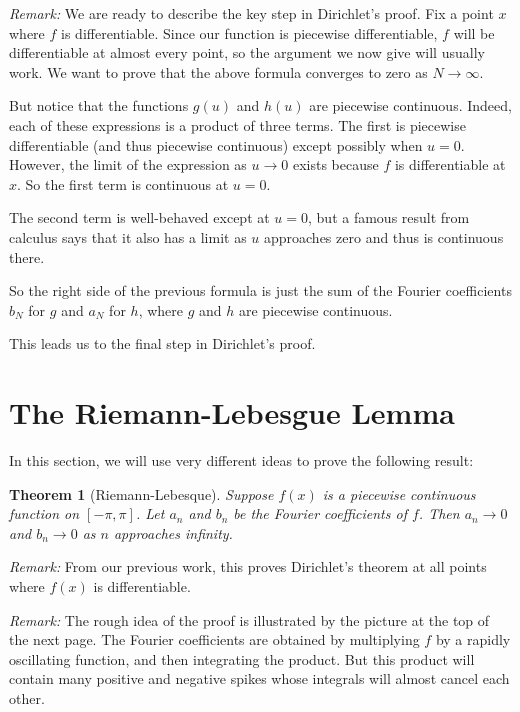 \documentclass[11pt, oneside]{amsart}
\newtheorem{theorem}{Theorem}
\begin{document}
{\em Remark:} We are ready to describe the key step in Dirichlet's proof. Fix a point $x$ where $f$ is differentiable. Since our function is piecewise differentiable, $f$ will be differentiable at almost every point, so the argument we now give will usually work. We want to prove that the above formula converges to zero as $N \rightarrow \infty$. 

But notice that the functions $g(u)$ and $h(u)$ are piecewise continuous. Indeed, each of these expressions is a product of three terms. The first is piecewise differentiable (and thus piecewise continuous) except possibly when $u = 0$. However, the limit of the expression as $u \rightarrow 0$ exists because $f$ is differentiable at $x$. So the first term is continuous at $u = 0$.

The second term is well-behaved except at $u = 0$, but a famous result from calculus says that it also has a limit as $u$ approaches zero and thus is continuous there. 

So the right side of the previous formula is just the sum of the Fourier coefficients $b_N$ for $g$ and $a_N$ for $h$, where $g$ and $h$ are piecewise continuous.

This leads us to the final step in Dirichlet's proof. 

\section{The Riemann-Lebesgue Lemma}

In this section, we will use very different ideas to prove the following  result:

\begin{theorem}[Riemann-Lebesque]
Suppose $f(x)$ is a piecewise continuous function on $[- \pi, \pi]$. Let $a_n$ and $b_n$ be the Fourier coefficients of $f$. Then $a_n \rightarrow 0$ and $b_n \rightarrow 0$ as $n$ approaches infinity.
\end{theorem}

{\em Remark:} From our previous work, this proves Dirichlet's theorem at all points where $f(x)$ is differentiable.

{\em Remark:} The rough idea of the proof is illustrated by the picture at the top of the next page. The Fourier coefficients are obtained by multiplying $f$ by a rapidly oscillating function, and then integrating the product. But this product will contain many positive and negative spikes whose integrals will almost cancel each other.
\end{document}
